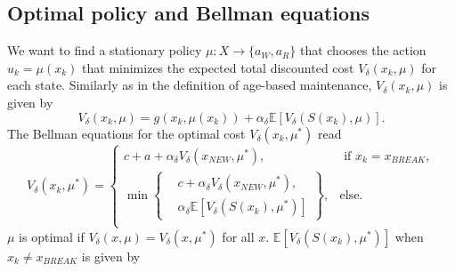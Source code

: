 \subsection{Optimal policy and Bellman equations}
We want to find a stationary policy $\mu:X\rightarrow \{a_W,a_R\}$ that chooses the action $u_k=\mu(x_k)$ that minimizes the expected total discounted cost $V_\delta(x_k,\mu)$ for each state.
Similarly as in the definition of age-based maintenance, $V_\delta(x_k,\mu)$ is given by
\[V_\delta(x_k,\mu)=g(x_k,\mu(x_k))+\alpha_\delta \mathbb{E}[V_\delta(S(x_k),\mu)].\]
The Bellman equations for the optimal cost $V_\delta(x_k,\mu^*)$ read
\begin{equation}\label{eq:SimpleFluidBellman}
V_\delta(x_k,\mu^*)=\begin{cases}
c+a+\alpha_\delta V_\delta(x_{NEW},\mu^*),&\text{ if }x_k=x_{BREAK},\\
\min\left\{\begin{split}&c+\alpha_\delta V_\delta(x_{NEW},\mu^*),\\&\alpha_\delta \mathbb{E}[V_\delta(S(x_k),\mu^*)]\end{split}\right\},&\text{else.}\\
\end{cases}
\end{equation}
$\mu$ is optimal if $V_\delta(x,\mu)=V_\delta(x,\mu^*)$ for all $x$.
$\mathbb{E}[V_\delta(S(x_k),\mu^*)]$ when $x_k\neq x_{BREAK}$ is given by 

